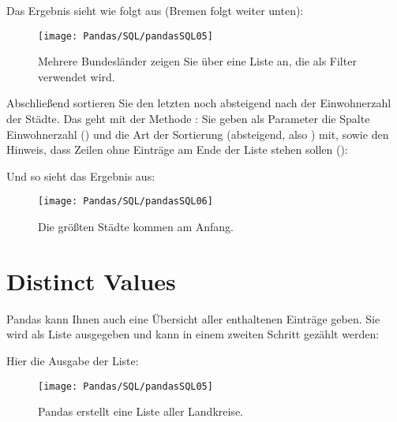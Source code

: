 Das Ergebnis sieht wie folgt aus (Bremen folgt weiter unten):

\begin{figure}
	\texttt{[image: Pandas/SQL/pandasSQL05]}
	\caption{Mehrere Bundesländer zeigen Sie über eine Liste an, die als Filter verwendet wird.}
\end{figure}

Abschließend sortieren Sie den letzten  noch absteigend nach der Einwohnerzahl der Städte. Das geht mit der Methode : Sie geben als Parameter die Spalte Einwohnerzahl () und die Art der Sortierung (absteigend, also ) mit, sowie den Hinweis, dass Zeilen ohne Einträge am Ende der Liste stehen sollen ():

\medskip



\medskip

Und so sieht das Ergebnis aus:

\begin{figure}
	\texttt{[image: Pandas/SQL/pandasSQL06]}
	\caption{Die größten Städte kommen am Anfang.}
\end{figure}

\section{Distinct Values}

Pandas kann Ihnen auch eine Übersicht aller enthaltenen Einträge geben. Sie wird als Liste ausgegeben und kann in einem zweiten Schritt gezählt werden:

\medskip




\PYTHON{}



\medskip


Hier die Ausgabe der Liste:

\begin{figure}
	\texttt{[image: Pandas/SQL/pandasSQL05]}
	\caption{Pandas erstellt eine Liste aller Landkreise.}
\end{figure}


